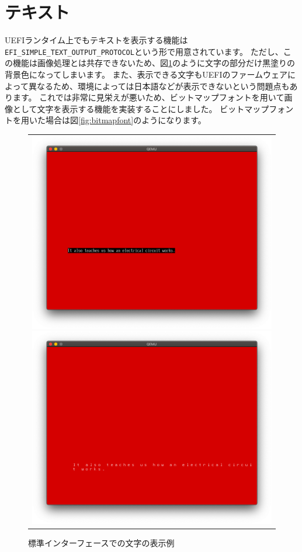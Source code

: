 \documentclass[10pt,b5paper,twoside,openany]{ltjsbook}
\begin{document}
\section{テキスト}
UEFIランタイム上でもテキストを表示する機能は\verb+EFI_SIMPLE_TEXT_OUTPUT_PROTOCOL+という形で用意されています。
ただし、この機能は画像処理とは共存できないため、図\ref{fig:defaultfont}のように文字の部分だけ黒塗りの背景色になってしまいます。
また、表示できる文字もUEFIのファームウェアによって異なるため、環境によっては日本語などが表示できないという問題点もあります。
これでは非常に見栄えが悪いため、ビットマップフォントを用いて画像として文字を表示する機能を実装することにしました。
ビットマップフォントを用いた場合は図\ref{fig:bitmapfont}のようになります。
\begin{figure}[H]
    \centering
    \begin{tabular}{c}
        \begin{minipage}{0.5\hsize}
            \centering
            \includegraphics[scale=0.22]{pic/defaultfont.png}
            \caption{標準インターフェースでの文字の表示例}
            \label{fig:defaultfont}
        \end{minipage}
        \begin{minipage}{0.5\hsize}
            \centering
            \includegraphics[scale=0.22]{pic/screenshot.png}

\end{minipage}
\end{tabular}
\end{figure}
\end{document}
